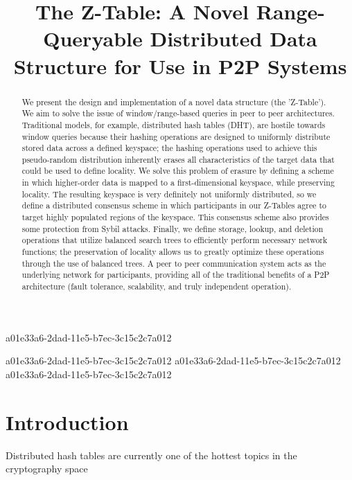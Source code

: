 \documentclass[12pt]{article}
\title{The Z-Table: A Novel Range-Queryable Distributed Data Structure for Use in P2P Systems}
\begin{document}
a01e33a6-2dad-11e5-b7ec-3c15c2c7a012\maketitle

\begin{abstract}
We present the design and implementation of a novel data structure (the 'Z-Table'). We aim to solve the issue of window/range-based queries in peer to peer architectures. Traditional models, for example,  distributed hash tables (DHT), are hostile towards window queries because their hashing operations are designed to uniformly distribute stored data across a defined keyspace; the hashing operations used to achieve this pseudo-random distribution inherently erases all characteristics of the target data that could be used to define locality. We solve this problem of erasure by defining a scheme in which higher-order data is mapped to a first-dimensional keyspace, while preserving locality. The resulting keyspace is very definitely not uniformly distributed, so we define a distributed consensus scheme in which participants in our Z-Tables agree to target highly populated regions of the keyspace. This consensus scheme also provides some protection from Sybil attacks. Finally, we define storage, lookup, and deletion operations that utilize balanced search trees to efficiently perform necessary network functions; the preservation of locality allows us to greatly optimize these operations through the use of balanced trees. A peer to peer communication system acts as the underlying network for participants, providing all of the traditional benefits of a P2P architecture (fault tolerance, scalability, and truly independent operation).
\end{abstract}
a01e33a6-2dad-11e5-b7ec-3c15c2c7a012
a01e33a6-2dad-11e5-b7ec-3c15c2c7a012
\newpage
a01e33a6-2dad-11e5-b7ec-3c15c2c7a012\section{Introduction}
Distributed hash tables are currently one of the hottest topics in the cryptography space~\cite{Stoica:2001dj,Rowstron:2001ea,Ratnasamy:2001wn}

\printbibliography
\end{document}
